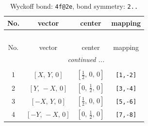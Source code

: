 \documentclass[fleqn,8pt]{jsarticle}
\begin{document}
\renewcommand{\arraystretch}{1.2}
\begin{longtable}{cccc}
\caption{Wyckoff bond: {\tt 4f@2e}, bond symmetry: {\tt 2..}}
 \\
 \hline \hline
No. & vector & center & mapping \\ \hline \endfirsthead

\multicolumn{3}{l}{\tablename\ \thetable{}} \\
 \hline \hline
No. & vector & center & mapping \\ \hline \endhead

 \hline \hline
\multicolumn{3}{r}{\footnotesize\it continued ...} \\ \endfoot

 \hline \hline
\multicolumn{3}{r}{} \\ \endlastfoot

1 & $\left[ X,\, Y,\, 0 \right]$ & $\left[ \frac{1}{2},\, 0,\, 0 \right]$ & {\tt [1,-2]} \\ \hline
2 & $\left[ Y,\, - X,\, 0 \right]$ & $\left[ 0,\, \frac{1}{2},\, 0 \right]$ & {\tt [3,-4]} \\ \hline
3 & $\left[ - X,\, Y,\, 0 \right]$ & $\left[ \frac{1}{2},\, 0,\, 0 \right]$ & {\tt [5,-6]} \\ \hline
4 & $\left[ - Y,\, - X,\, 0 \right]$ & $\left[ 0,\, \frac{1}{2},\, 0 \right]$ & {\tt [7,-8]} \\
\end{longtable}
\renewcommand{\arraystretch}{1.2}
\end{document}
